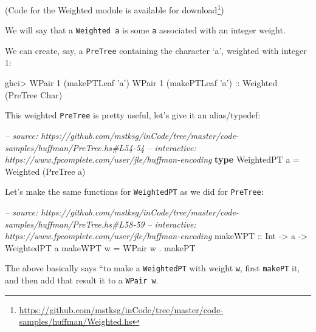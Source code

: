 \documentclass[]{article}
\newenvironment{Shaded}{}{}
\newcommand{\KeywordTok}[1]{\textcolor[rgb]{0.00,0.44,0.13}{\textbf{{#1}}}}
\newcommand{\DataTypeTok}[1]{\textcolor[rgb]{0.56,0.13,0.00}{{#1}}}
\newcommand{\DecValTok}[1]{\textcolor[rgb]{0.25,0.63,0.44}{{#1}}}
\newcommand{\CharTok}[1]{\textcolor[rgb]{0.25,0.44,0.63}{{#1}}}
\newcommand{\CommentTok}[1]{\textcolor[rgb]{0.38,0.63,0.69}{\textit{{#1}}}}
\newcommand{\OtherTok}[1]{\textcolor[rgb]{0.00,0.44,0.13}{{#1}}}
\newcommand{\FunctionTok}[1]{\textcolor[rgb]{0.02,0.16,0.49}{{#1}}}
\newcommand{\NormalTok}[1]{{#1}}
\renewcommand{\href}[2]{#2\footnote{\url{#1}}}
\begin{document}
(Code for the Weighted module is
\href{https://github.com/mstksg/inCode/tree/master/code-samples/huffman/Weighted.hs}{available
for download})

We will say that a \texttt{Weighted\ a} is some \texttt{a} associated
with an integer weight.

We can create, say, a \texttt{PreTree} containing the character `a',
weighted with integer 1:

\begin{Shaded}
\begin{Highlighting}[]
\NormalTok{ghci}\FunctionTok{>} \DataTypeTok{WPair} \DecValTok{1} \NormalTok{(makePTLeaf }\CharTok{'a'}\NormalTok{)}
\DataTypeTok{WPair} \DecValTok{1} \NormalTok{(makePTLeaf }\CharTok{'a'}\NormalTok{)}\OtherTok{ ::} \DataTypeTok{Weighted} \NormalTok{(}\DataTypeTok{PreTree} \DataTypeTok{Char}\NormalTok{)}
\end{Highlighting}
\end{Shaded}

This weighted \texttt{PreTree} is pretty useful, let's give it an
alias/typedef:

\begin{Shaded}
\begin{Highlighting}[]
\CommentTok{-- source: https://github.com/mstksg/inCode/tree/master/code-samples/huffman/PreTree.hs#L54-54}
\CommentTok{-- interactive: https://www.fpcomplete.com/user/jle/huffman-encoding}
\KeywordTok{type} \DataTypeTok{WeightedPT} \NormalTok{a }\FunctionTok{=} \DataTypeTok{Weighted} \NormalTok{(}\DataTypeTok{PreTree} \NormalTok{a)}
\end{Highlighting}
\end{Shaded}

Let's make the same functions for \texttt{WeightedPT} as we did for
\texttt{PreTree}:

\begin{Shaded}
\begin{Highlighting}[]
\CommentTok{-- source: https://github.com/mstksg/inCode/tree/master/code-samples/huffman/PreTree.hs#L58-59}
\CommentTok{-- interactive: https://www.fpcomplete.com/user/jle/huffman-encoding}
\OtherTok{makeWPT ::} \DataTypeTok{Int} \OtherTok{->} \NormalTok{a }\OtherTok{->} \DataTypeTok{WeightedPT} \NormalTok{a}
\NormalTok{makeWPT w }\FunctionTok{=} \DataTypeTok{WPair} \NormalTok{w }\FunctionTok{.} \NormalTok{makePT}
\end{Highlighting}
\end{Shaded}

The above basically says ``to make a \texttt{WeightedPT} with weight
\texttt{w}, first \texttt{makePT} it, and then add that result it to a
\texttt{WPair\ w}.
\end{document}
